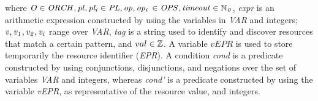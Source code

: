 \hspace{0.4cm}where ${\it O \in ORCH, pl,pl_{i} \in PL, op,op_{i}}$ ${\it \in OPS, timeout \in \mathbb{N}_{0}}$, {\it  expr} is an arithmetic expression constructed by using the variables in {\it VAR} and integers; ${\it v,v_1,v_2,v_i}$ range over {\it VAR}, {\it tag} is a string used to identify and discover resources that match a certain pattern, and $val \in \mathbb{Z}$. A variable $vEPR$ is used to store temporarily the resource identifier ({\it EPR}). A condition {\it cond} is a predicate constructed by using conjunctions, disjunctions, and negations over the set of variables {\it VAR} and integers, whereas {\it cond'} is a predicate constructed by using the variable {\it vEPR}, as representative of the resource value, and integers. \\%

